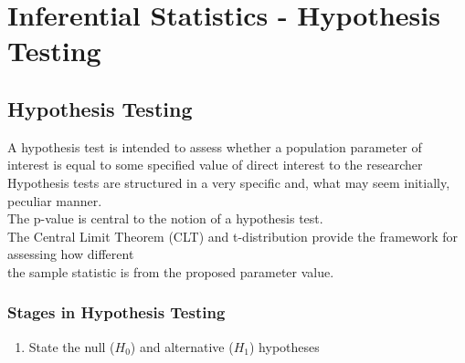 \documentclass[a4paper, 10pt]{article}
\begin{document}
\section{Inferential Statistics - Hypothesis Testing}
\subsection{Hypothesis Testing}
A hypothesis test is intended to assess whether a population parameter of interest is equal to some
specified value of direct interest to the researcher \\
Hypothesis tests are structured in a very specific and, what may seem initially, peculiar manner. \\
The p-value is central to the notion of a hypothesis test. \\
The Central Limit Theorem (CLT) and t-distribution provide the framework for assessing how different \\
the sample statistic is from the proposed parameter value.

\subsubsection{Stages in Hypothesis Testing}
\begin{enumerate}
    \item State the null ($H_0$) and alternative ($H_1$) hypotheses
\end{enumerate}
\end{document}
